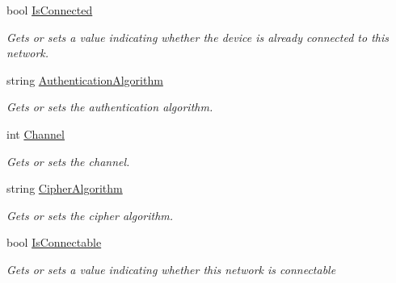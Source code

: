 \begin{DoxyCompactItemize}
\item 
bool \hyperlink{class_microsoft_1_1_tools_1_1_windows_device_portal_1_1_device_portal_1_1_wifi_network_info_acc3bf4f8576c224ed54404db8dc0fc06}{Is\+Connected}
\begin{DoxyCompactList}\small\item\em Gets or sets a value indicating whether the device is already connected to this network. \end{DoxyCompactList}\item 
string \hyperlink{class_microsoft_1_1_tools_1_1_windows_device_portal_1_1_device_portal_1_1_wifi_network_info_a66374e9ecd5fcb5dfcdf2f3592aec63b}{Authentication\+Algorithm}
\begin{DoxyCompactList}\small\item\em Gets or sets the authentication algorithm. \end{DoxyCompactList}\item 
int \hyperlink{class_microsoft_1_1_tools_1_1_windows_device_portal_1_1_device_portal_1_1_wifi_network_info_a84165c7dee59b2eebeed08673f0710e1}{Channel}
\begin{DoxyCompactList}\small\item\em Gets or sets the channel. \end{DoxyCompactList}\item 
string \hyperlink{class_microsoft_1_1_tools_1_1_windows_device_portal_1_1_device_portal_1_1_wifi_network_info_a8fb432df12e6ae39c9eb6f39238386f0}{Cipher\+Algorithm}
\begin{DoxyCompactList}\small\item\em Gets or sets the cipher algorithm. \end{DoxyCompactList}\item 
bool \hyperlink{class_microsoft_1_1_tools_1_1_windows_device_portal_1_1_device_portal_1_1_wifi_network_info_a3109838bf253ad7f74bc628e96b63e76}{Is\+Connectable}
\begin{DoxyCompactList}\small\item\em Gets or sets a value indicating whether this network is connectable \end{DoxyCompactList}\item 

\end{DoxyCompactItemize}
